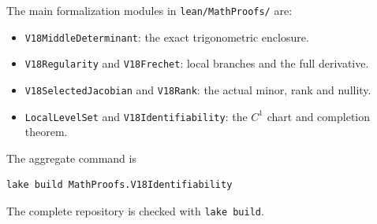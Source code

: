 \documentclass[11pt]{article}
\begin{document}
The main formalization modules in \texttt{lean/MathProofs/} are:
\begin{itemize}
\item \texttt{V18MiddleDeterminant}: the exact trigonometric enclosure.
\item \texttt{V18Regularity} and \texttt{V18Frechet}: local branches and the full derivative.
\item \texttt{V18SelectedJacobian} and \texttt{V18Rank}: the actual minor, rank and nullity.
\item \texttt{LocalLevelSet} and \texttt{V18Identifiability}: the $C^1$ chart and completion theorem.
\end{itemize}
The aggregate command is
\begin{verbatim}
lake build MathProofs.V18Identifiability
\end{verbatim}
The complete repository is checked with \texttt{lake build}.
\end{document}
